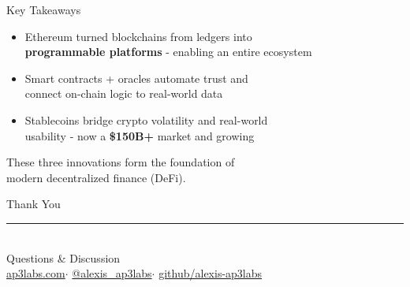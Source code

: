 \documentclass[aspectratio=169, 11pt]{beamer}
\begin{document}
\begin{frame}{Key Takeaways}
  \begin{itemize}
    \setlength{\itemsep}{14pt}
    \item \textcolor{ap3orange}{Ethereum} turned blockchains from ledgers into\\
          \textbf{programmable platforms} - enabling an entire ecosystem
    \item \textcolor{ap3orange}{Smart contracts + oracles} automate trust and\\
          connect on-chain logic to real-world data
    \item \textcolor{ap3orange}{Stablecoins} bridge crypto volatility and real-world\\
          usability - now a \textbf{\$150B+} market and growing
  \end{itemize}

  \vspace{12pt}
  \begin{center}
    \textcolor{ap3slate}{\small These three innovations form the foundation of\\
    modern decentralized finance (DeFi).}
  \end{center}

\end{frame}

\begin{frame}[plain]
  \vfill
  \begin{center}
    {\textcolor{ap3orange}{Thank You}}\\[16pt]
    \textcolor{ap3orange}{\rule{0.2\textwidth}{1.5pt}}\\[16pt]
    {\large\textcolor{ap3cream}{Questions \& Discussion}}\\[24pt]
    \textcolor{ap3slate}{\small
      \href{https://ap3labs.com}{ap3labs.com}\quad$\cdot$\quad
      \href{https://x.com/alexis\_ap3labs}{@alexis\_ap3labs}\quad$\cdot$\quad
      \href{https://github.com/alexis-ap3labs}{github/alexis-ap3labs}
    }
  \end{center}
  \vfill

\end{frame}
\end{document}
